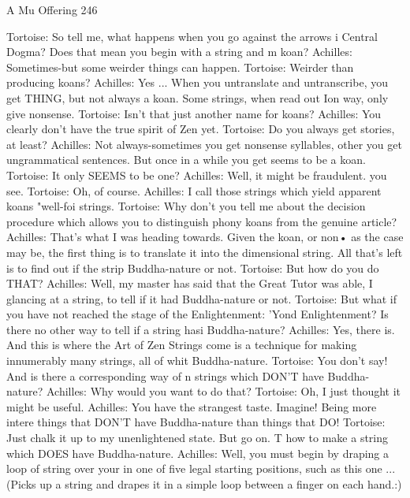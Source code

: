 A Mu Offering                                                                             246

Tortoise: So tell me, what happens when you go against the arrows i Central Dogma?
   Does that mean you begin with a string and m koan?
Achilles: Sometimes-but some weirder things can happen.
Tortoise: Weirder than producing koans?
Achilles: Yes ... When you untranslate and untranscribe, you get THING, but not always
   a koan. Some strings, when read out Ion way, only give nonsense.
Tortoise: Isn't that just another name for koans?
Achilles: You clearly don't have the true spirit of Zen yet.
Tortoise: Do you always get stories, at least?
Achilles: Not always-sometimes you get nonsense syllables, other you get ungrammatical
   sentences. But once in a while you get seems to be a koan.
Tortoise: It only SEEMS to be one?
Achilles: Well, it might be fraudulent. you see.
Tortoise: Oh, of course.
Achilles: I call those strings which yield apparent koans "well-foi strings.
Tortoise: Why don't you tell me about the decision procedure which allows you to
   distinguish phony koans from the genuine article?
Achilles: That's what I was heading towards. Given the koan, or non• as the case may be,
   the first thing is to translate it into the dimensional string. All that's left is to find out
   if the strip Buddha-nature or not.
Tortoise: But how do you do THAT?
Achilles: Well, my master has said that the Great Tutor was able, I glancing at a string, to
   tell if it had Buddha-nature or not.
Tortoise: But what if you have not reached the stage of the Enlightenment: 'Yond
   Enlightenment? Is there no other way to tell if a string hasi Buddha-nature?
Achilles: Yes, there is. And this is where the Art of Zen Strings come is a technique for
   making innumerably many strings, all of whit Buddha-nature.
Tortoise: You don't say! And is there a corresponding way of n strings which DON'T
   have Buddha-nature?
Achilles: Why would you want to do that?
Tortoise: Oh, I just thought it might be useful.
Achilles: You have the strangest taste. Imagine! Being more intere things that DON'T
   have Buddha-nature than things that DO!
Tortoise: Just chalk it up to my unenlightened state. But go on. T how to make a string
   which DOES have Buddha-nature.
Achilles: Well, you must begin by draping a loop of string over your in one of five legal
   starting positions, such as this one ... (Picks up a string and drapes it in a simple loop
   between a finger on each hand.:)




